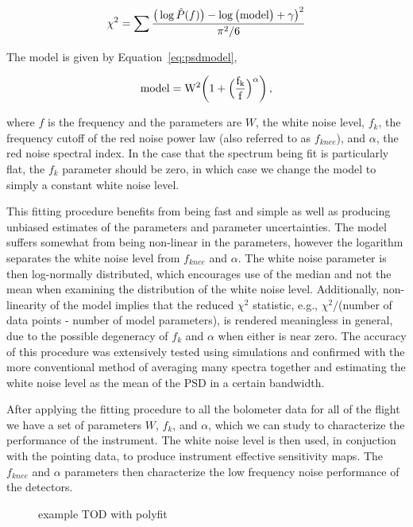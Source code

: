 \documentclass[../EBEXPaper2.tex]{subfiles}
\begin{document}
\begin{equation}
\chi^2 = \sum\frac{\big(\log\hat{P}(f)\big) - \log\big(\rm{model}\big) + \gamma\big)^2}{\pi^2/6}
\label{eq:lnresid}
\end{equation}

\noindent The model is given by Equation~\ref{eq:psdmodel},

\begin{equation}
\rm{model} = W^2\bigg(1+\Big(\frac{f_k}{f}\Big)^{\alpha}\bigg) \,,
\label{eq:psdmodel}
\end{equation}

\noindent where $f$ is the frequency and the parameters are $W$, the white noise level, $f_k$, the frequency cutoff of the red noise power law (also referred to as $f_{knee}$), and $\alpha$, the red noise spectral index. In the case that the spectrum being fit is particularly flat, the $f_k$ parameter should be zero, in which case we change the model to simply a constant white noise level.

This fitting procedure benefits from being fast and simple as well as producing unbiased estimates of the parameters and parameter uncertainties. The model suffers somewhat from being non-linear in the parameters, however the logarithm separates the white noise level from $f_{knee}$ and $\alpha$. The white noise parameter is then log-normally distributed, which encourages use of the median and not the mean when examining the distribution of the white noise level. Additionally, non-linearity of the model implies that the reduced $\chi^2$ statistic, e.g., $\chi^2/$(number of data points - number of model parameters), is rendered meaningless in general, due to the possible degeneracy of $f_k$ and $\alpha$ when either is near zero. The accuracy of this procedure was extensively tested using simulations and confirmed with the more conventional method of averaging many spectra together and estimating the white noise level as the mean of the PSD in a certain bandwidth. 

After applying the fitting procedure to all the bolometer data for all of the flight we have a set of parameters $W$, $f_k$, and $\alpha$, which we can study to characterize the performance of the instrument. The white noise level is then used, in conjuction with the pointing data, to produce instrument effective sensitivity maps. The $f_{knee}$ and $\alpha$ parameters then characterize the low frequency noise performance of the detectors.  


\begin{figure}
\caption{example TOD with polyfit}
\end{figure}
\end{document}
